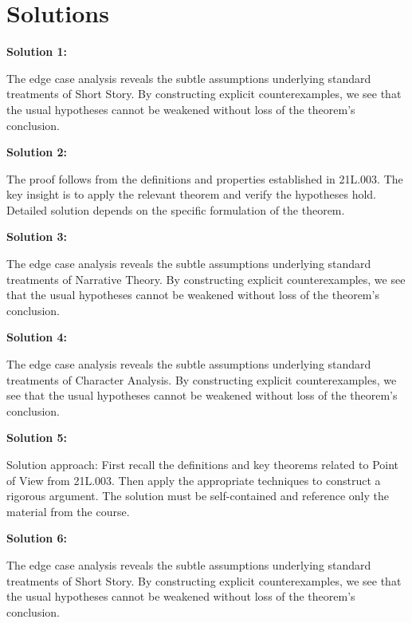 \documentclass[12pt,a4paper]{exam}
\begin{document}
\newpage
\section*{Solutions}

\textbf{Solution 1:}

The edge case analysis reveals the subtle assumptions underlying standard treatments of Short Story. By constructing explicit counterexamples, we see that the usual hypotheses cannot be weakened without loss of the theorem's conclusion.

\vspace{0.5cm}

\textbf{Solution 2:}

The proof follows from the definitions and properties established in 21L.003. The key insight is to apply the relevant theorem and verify the hypotheses hold. Detailed solution depends on the specific formulation of the theorem.

\vspace{0.5cm}

\textbf{Solution 3:}

The edge case analysis reveals the subtle assumptions underlying standard treatments of Narrative Theory. By constructing explicit counterexamples, we see that the usual hypotheses cannot be weakened without loss of the theorem's conclusion.

\vspace{0.5cm}

\textbf{Solution 4:}

The edge case analysis reveals the subtle assumptions underlying standard treatments of Character Analysis. By constructing explicit counterexamples, we see that the usual hypotheses cannot be weakened without loss of the theorem's conclusion.

\vspace{0.5cm}

\textbf{Solution 5:}

Solution approach: First recall the definitions and key theorems related to Point of View from 21L.003. Then apply the appropriate techniques to construct a rigorous argument. The solution must be self-contained and reference only the material from the course.

\vspace{0.5cm}

\textbf{Solution 6:}

The edge case analysis reveals the subtle assumptions underlying standard treatments of Short Story. By constructing explicit counterexamples, we see that the usual hypotheses cannot be weakened without loss of the theorem's conclusion.
\end{document}
